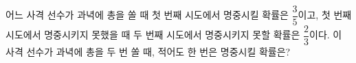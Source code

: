 어느 사격 선수가 과녁에 총을 쏠 때 첫 번째 시도에서 명중시킬 확률은 $\dfrac{3}{5}$이고, 첫 번째 시도에서 명중시키지 못했을 때 두 번째 시도에서 명중시키지 못할 확률은 $\dfrac{2}{3}$이다. 이 사격 선수가 과녁에 총을 두 번 쏠 때, 적어도 한 번은 명중시킬 확률은?

